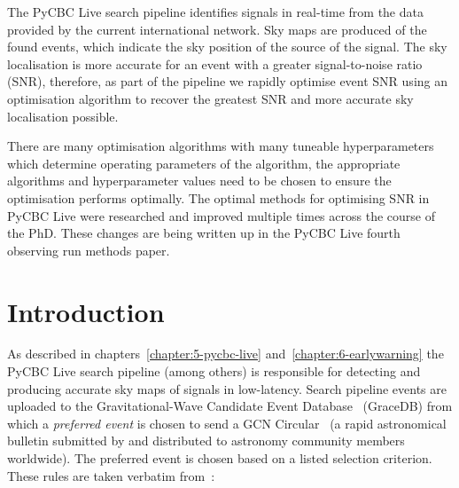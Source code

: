 The PyCBC Live search pipeline identifies \gwadj signals in real-time from the \gwadj data provided by the current international \gwadj network. Sky maps are produced of the found \gwadj events, which indicate the sky position of the source of the signal. The sky localisation is more accurate for an event with a greater signal-to-noise ratio (SNR), therefore, as part of the pipeline we rapidly optimise event SNR using an optimisation algorithm to recover the greatest SNR and more accurate sky localisation possible.

There are many optimisation algorithms with many tuneable hyperparameters which determine operating parameters of the algorithm, the appropriate algorithms and hyperparameter values need to be chosen to ensure the optimisation performs optimally. The optimal methods for optimising SNR in PyCBC Live were researched and improved multiple times across the course of the PhD. These changes are being written up in the PyCBC Live fourth observing run methods paper.

\section{\label{7:sec:introduction}Introduction}


As described in chapters~\ref{chapter:5-pycbc-live} and~\ref{chapter:6-earlywarning} the PyCBC Live search pipeline (among others) is responsible for detecting and producing accurate sky maps of \gwadj signals in low-latency. Search pipeline events are uploaded to the Gravitational-Wave Candidate Event Database~\cite{ligo_gracedb:2024} (GraceDB) from which a \textit{preferred event} is chosen to send a GCN Circular~\cite{gcn_circulars:2024} (a rapid astronomical bulletin submitted by and distributed to astronomy community members worldwide). The preferred event is chosen based on a listed selection criterion. These rules are taken verbatim from~\cite{gracedb_superevent_selection}:

